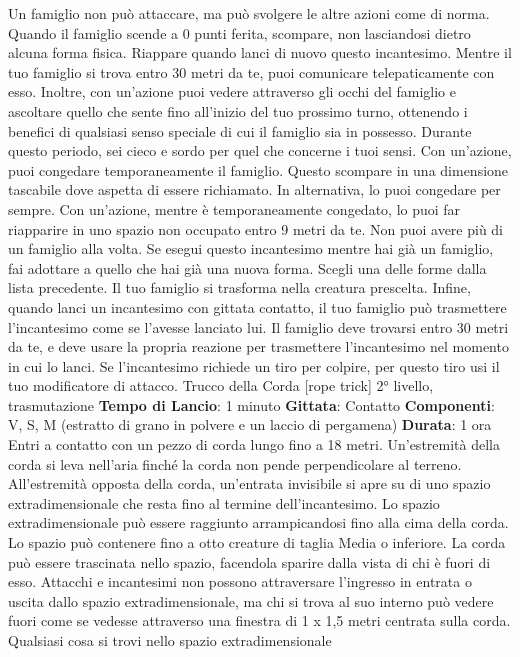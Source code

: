 \begin{multicols}{2}
Un famiglio non può attaccare, ma può svolgere le altre
azioni come di norma.
Quando il famiglio scende a 0 punti ferita, scompare,
non lasciandosi dietro alcuna forma fisica. Riappare
quando lanci di nuovo questo incantesimo.
Mentre il tuo famiglio si trova entro 30 metri da te, puoi
comunicare telepaticamente con esso. Inoltre, con
un’azione puoi vedere attraverso gli occhi del famiglio e
ascoltare quello che sente fino all’inizio del tuo
prossimo turno, ottenendo i benefici di qualsiasi senso
speciale di cui il famiglio sia in possesso. Durante
questo periodo, sei cieco e sordo per quel che
concerne i tuoi sensi.
Con un’azione, puoi congedare temporaneamente il
famiglio. Questo scompare in una dimensione tascabile
dove aspetta di essere richiamato. In alternativa, lo puoi
congedare per sempre. Con un’azione, mentre è
temporaneamente congedato, lo puoi far riapparire in
uno spazio non occupato entro 9 metri da te.
Non puoi avere più di un famiglio alla volta. Se esegui
questo incantesimo mentre hai già un famiglio, fai
adottare a quello che hai già una nuova forma. Scegli
una delle forme dalla lista precedente. Il tuo famiglio si
trasforma nella creatura prescelta.
Infine, quando lanci un incantesimo con gittata contatto,
il tuo famiglio può trasmettere l’incantesimo come se
l’avesse lanciato lui. Il famiglio deve trovarsi entro 30
metri da te, e deve usare la propria reazione per
trasmettere l’incantesimo nel momento in cui lo lanci.
Se l’incantesimo richiede un tiro per colpire, per questo
tiro usi il tuo modificatore di attacco.
Trucco della Corda
[rope trick]
2° livello, trasmutazione
\textbf{Tempo di Lancio}: 1 minuto
\textbf{Gittata}: Contatto
\textbf{Componenti}: V, S, M (estratto di grano in polvere e un
laccio di pergamena)
\textbf{Durata}: 1 ora
Entri a contatto con un pezzo di corda lungo fino a 18
metri. Un’estremità della corda si leva nell’aria finché la
corda non pende perpendicolare al terreno.
All’estremità opposta della corda, un’entrata invisibile si
apre su di uno spazio extradimensionale che resta fino
al termine dell’incantesimo.
Lo spazio extradimensionale può essere raggiunto
arrampicandosi fino alla cima della corda. Lo spazio
può contenere fino a otto creature di taglia Media o
inferiore. La corda può essere trascinata nello spazio,
facendola sparire dalla vista di chi è fuori di esso.
Attacchi e incantesimi non possono attraversare
l’ingresso in entrata o uscita dallo spazio
extradimensionale, ma chi si trova al suo interno può
vedere fuori come se vedesse attraverso una finestra di
1 x 1,5 metri centrata sulla corda.
Qualsiasi cosa si trovi nello spazio extradimensionale

\end{multicols}
